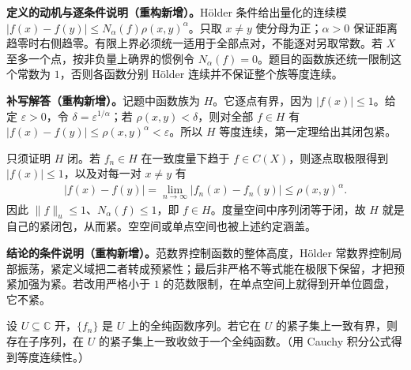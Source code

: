 \documentclass[../../main.tex]{subfiles}%
\begin{document}
\begin{remark}
\textbf{定义的动机与逐条件说明（重构新增）。}H\"older 条件给出量化的连续模 $|f(x)-f(y)|\le N_\alpha(f)\rho(x,y)^\alpha$。只取 $x\ne y$ 使分母为正；$\alpha>0$ 保证距离趋零时右侧趋零。有限上界必须统一适用于全部点对，不能逐对另取常数。若 $X$ 至多一个点，按非负量上确界的惯例令 $N_\alpha(f)=0$。题目的函数族还统一限制这个常数为 $1$，否则各函数分别 H\"older 连续并不保证整个族等度连续。
\end{remark}
\begin{solution}
\textbf{补写解答（重构新增）。}记题中函数族为 $H$。它逐点有界，因为 $|f(x)|\le1$。给定 $\varepsilon>0$，令 $\delta=\varepsilon^{1/\alpha}$；若 $\rho(x,y)<\delta$，则对全部 $f\in H$ 有 $|f(x)-f(y)|\le\rho(x,y)^\alpha<\varepsilon$。所以 $H$ 等度连续，第一定理给出其闭包紧。

只须证明 $H$ 闭。若 $f_n\in H$ 在一致度量下趋于 $f\in C(X)$，则逐点取极限得到 $|f(x)|\le1$，以及对每一对 $x\ne y$ 有
\begin{align*}
|f(x)-f(y)|=\lim_{n\to\infty}|f_n(x)-f_n(y)|\le\rho(x,y)^\alpha.
\end{align*}
因此 $\|f\|_u\le1$、$N_\alpha(f)\le1$，即 $f\in H$。度量空间中序列闭等于闭，故 $H$ 就是自己的紧闭包，从而紧。空空间或单点空间也被上述约定涵盖。
\end{solution}
\begin{remark}
\textbf{结论的条件说明（重构新增）。}范数界控制函数的整体高度，H\"older 常数界控制局部振荡，紧定义域把二者转成预紧性；最后非严格不等式能在极限下保留，才把预紧加强为紧。若改用严格小于 $1$ 的范数限制，在单点空间上就得到开单位圆盘，它不紧。
\end{remark}
\begin{exercise}\label{exercise:ch04-holomorphic-family}
设 $U\subseteq\mathbb C$ 开，$\{f_n\}$ 是 $U$ 上的全纯函数序列。若它在 $U$ 的紧子集上一致有界，则存在子序列，在 $U$ 的紧子集上一致收敛于一个全纯函数。（用 Cauchy 积分公式得到等度连续性。）
\end{exercise}
\end{document}

